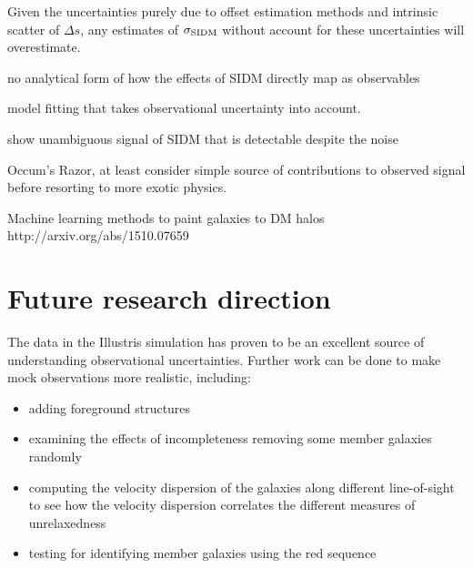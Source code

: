Given the uncertainties purely due to offset estimation methods and 
intrinsic scatter of $\Delta s$, any estimates of $\sigma_{\rm SIDM}$ without
account for these uncertainties will overestimate. 

  


no analytical form of how the effects of SIDM directly map as observables  
 
model fitting that takes  observational uncertainty into account. 

show unambiguous signal of SIDM that is detectable despite the noise 

Occum's Razor, at least consider simple source of contributions to observed signal 
before resorting to more exotic physics.

Machine learning methods to paint galaxies to DM halos 
http://arxiv.org/abs/1510.07659


\section{Future research direction}
The data in the Illustris simulation has proven to be an excellent source of
understanding observational uncertainties.
Further work can be done to make mock observations more realistic, including:
\begin{itemize}
		\item adding foreground structures 
		\item examining the effects of incompleteness removing some member galaxies randomly 
		\item computing the velocity dispersion of the galaxies along different
			line-of-sight to see how the velocity dispersion correlates the different
			measures of unrelaxedness
		\item testing for identifying member galaxies using the red sequence
	\end{itemize}


